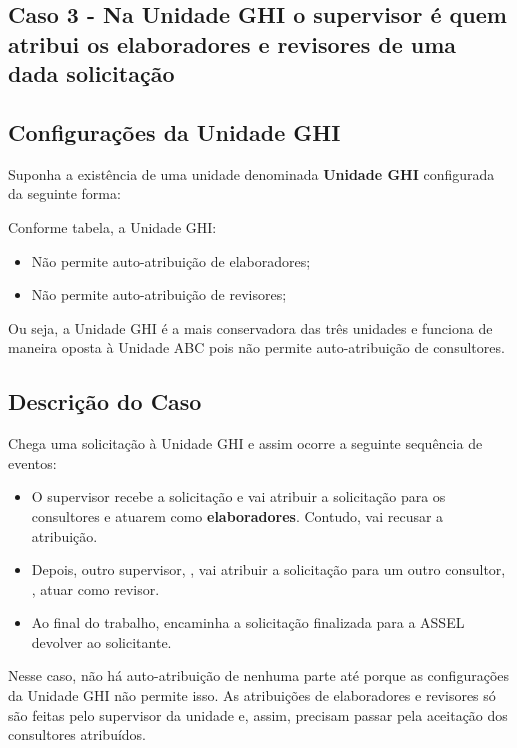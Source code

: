 \begin{landscape}
\section{Caso 3 - Na Unidade GHI o supervisor é quem atribui os elaboradores e revisores de uma dada solicitação}

\subsection*{Configurações da Unidade GHI}

Suponha a existência de uma unidade denominada \textbf{Unidade GHI} configurada da seguinte forma: 


Conforme tabela, a Unidade GHI:
\begin{itemize}
	\item Não permite auto-atribuição de elaboradores;
	\item Não permite auto-atribuição de revisores;
\end{itemize}

Ou seja, a Unidade GHI é a mais conservadora das três unidades e funciona de maneira oposta à Unidade ABC pois não permite auto-atribuição de consultores.

\subsection*{Descrição do Caso}

Chega uma solicitação \SOLU à Unidade GHI e assim ocorre a seguinte sequência de eventos:
\begin{itemize}
	\item O supervisor \SU recebe a solicitação e vai atribuir a solicitação para os consultores \EU e \ED atuarem como \textbf{elaboradores}. Contudo, \EU vai recusar a atribuição.
	\item Depois, outro supervisor, \SD, vai atribuir a solicitação para um outro consultor, \RU, atuar como revisor.
	\item Ao final do trabalho, \SD encaminha a solicitação finalizada para a ASSEL devolver ao solicitante.		
\end{itemize}

Nesse caso, não há auto-atribuição de nenhuma parte até porque as configurações da Unidade GHI não permite isso. As atribuições de elaboradores e revisores só são feitas pelo supervisor da unidade e, assim, precisam passar pela aceitação dos consultores atribuídos. 


\end{landscape}

